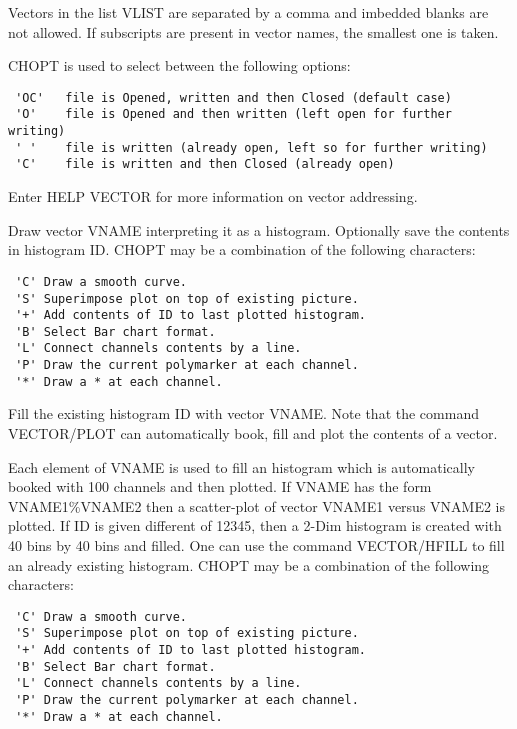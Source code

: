 Vectors in the list VLIST are separated by a comma and
imbedded blanks are not allowed. If subscripts are present
in vector names, the smallest one is taken.

CHOPT is used to select between the following options:
\begin{verbatim}
 'OC'   file is Opened, written and then Closed (default case)
 'O'    file is Opened and then written (left open for further writing)
 ' '    file is written (already open, left so for further writing)
 'C'    file is written and then Closed (already open)
\end{verbatim}
Enter HELP VECTOR for more information on vector addressing.
\ENDTEXT

\BEGARG
{}
\ENDARG
\BEGTEXT
Draw vector VNAME interpreting it as a histogram.
Optionally save the contents in histogram ID.
CHOPT may be a combination of the following characters:
\begin{verbatim}
 'C' Draw a smooth curve.
 'S' Superimpose plot on top of existing picture.
 '+' Add contents of ID to last plotted histogram.
 'B' Select Bar chart format.
 'L' Connect channels contents by a line.
 'P' Draw the current polymarker at each channel.
 '*' Draw a * at each channel.
\end{verbatim}
\ENDTEXT

\BEGARG
{}
\ENDARG
\BEGTEXT
Fill the existing histogram ID with vector VNAME.
Note that the command VECTOR/PLOT can automatically book, fill and plot
the contents of a vector.
\ENDTEXT

\BEGARG
{}
\ENDARG
\BEGTEXT
Each element of VNAME is used to fill an histogram
which is automatically booked with 100 channels and then plotted.
If VNAME has the form VNAME1\%VNAME2 then a scatter-plot of vector VNAME1
versus VNAME2 is plotted. If ID is given different of 12345, then
a 2-Dim histogram is created with 40 bins by 40 bins and filled.
One can use the command VECTOR/HFILL to fill an already existing
histogram.
CHOPT may be a combination of the following characters:
\begin{verbatim}
 'C' Draw a smooth curve.
 'S' Superimpose plot on top of existing picture.
 '+' Add contents of ID to last plotted histogram.
 'B' Select Bar chart format.
 'L' Connect channels contents by a line.
 'P' Draw the current polymarker at each channel.
 '*' Draw a * at each channel.
\end{verbatim}
\ENDTEXT

